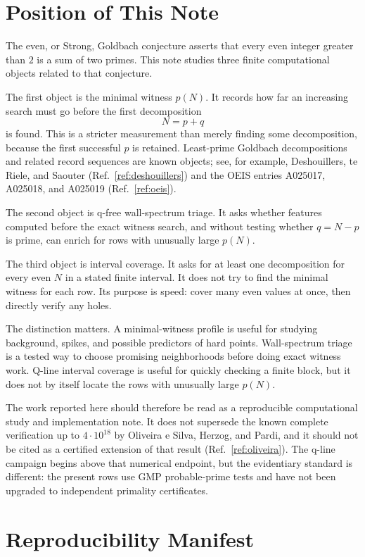 \documentclass[11pt]{article}
\begin{document}
\section{Position of This Note}

The even, or Strong, Goldbach conjecture asserts that every even integer
greater than \(2\) is a sum of two primes. This note studies three finite
computational objects related to that conjecture.

The first object is the minimal witness \(p(N)\). It records how far an
increasing search must go before the first decomposition
\[
  N=p+q
\]
is found. This is a stricter measurement than merely finding some
decomposition, because the first successful \(p\) is retained.
Least-prime Goldbach decompositions and related record sequences are known
objects; see, for example, Deshouillers, te Riele, and Saouter
(Ref.~\ref{ref:deshouillers}) and the OEIS entries A025017, A025018, and
A025019 (Ref.~\ref{ref:oeis}).

The second object is q-free wall-spectrum triage. It asks whether features
computed before the exact witness search, and without testing whether
\(q=N-p\) is prime, can enrich for rows with unusually large \(p(N)\).

The third object is interval coverage. It asks for at least one decomposition
for every even \(N\) in a stated finite interval. It does not try to find the
minimal witness for each row. Its purpose is speed: cover many even values at
once, then directly verify any holes.

The distinction matters. A minimal-witness profile is useful for studying
background, spikes, and possible predictors of hard points. Wall-spectrum
triage is a tested way to choose promising neighborhoods before doing exact
witness work. Q-line interval coverage is useful for quickly checking a finite
block, but it does not by itself locate the rows with unusually large
\(p(N)\).

The work reported here should therefore be read as a reproducible computational
study and implementation note. It does not supersede the known complete
verification up to \(4\cdot10^{18}\) by Oliveira e Silva, Herzog, and Pardi,
and it should not be cited as a certified extension of that result
(Ref.~\ref{ref:oliveira}). The q-line campaign begins above that numerical
endpoint, but the evidentiary standard is different: the present rows use GMP
probable-prime tests and have not been upgraded to independent primality
certificates.

\section{Reproducibility Manifest}
\end{document}
